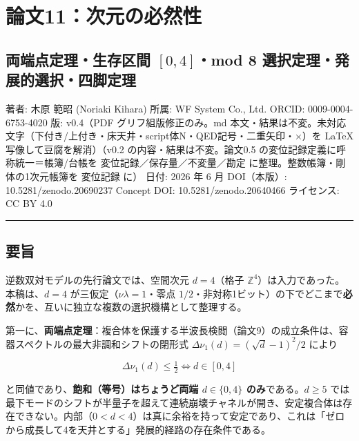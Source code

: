 \documentclass[
]{ltjsarticle}
\author{}
\date{}
\begin{document}
\section{論文11：次元の必然性}\label{ux8ad6ux658711ux6b21ux5143ux306eux5fc5ux7136ux6027}

\subsection{\texorpdfstring{両端点定理・生存区間 \([0,4]\)・mod 8
選択定理・発展的選択・四脚定理}{両端点定理・生存区間 {[}0,4{]}・mod 8 選択定理・発展的選択・四脚定理}}\label{ux4e21ux7aefux70b9ux5b9aux7406ux751fux5b58ux533aux9593-04mod-8-ux9078ux629eux5b9aux7406ux767aux5c55ux7684ux9078ux629eux56dbux811aux5b9aux7406}

著者: 木原 範昭 (Noriaki Kihara) 所属: WF System Co., Ltd. ORCID:
0009-0004-6753-4020 版: v0.4（PDF グリフ組版修正のみ。md
本文・結果は不変。未対応文字（下付き/上付き・床天井・script体N・QED記号・二重矢印・×）を
LaTeX 写像して豆腐を解消）（v0.2 の内容・結果は不変。論文0.5
の変位記録定義に呼称統一＝帳簿/台帳を 変位記録／保存量／不変量／勘定
に整理。整数帳簿・剛体の1次元帳簿を 変位記録 に） 日付: 2026 年 6 月
DOI（本版）: 10.5281/zenodo.20690237 Concept DOI:
10.5281/zenodo.20640466 ライセンス: CC BY 4.0

\begin{center}\rule{0.5\linewidth}{0.5pt}\end{center}

\subsection{要旨}\label{ux8981ux65e8}

逆数双対モデルの先行論文では、空間次元 \(d=4\)（格子
\(\mathbb{Z}^4\)）は入力であった。本稿は、\(d=4\)
が三仮定（\(\nu\lambda=1\)・零点
\(1/2\)・非対称1ビット）の下でどこまで\textbf{必然}かを、互いに独立な複数の選択機構として整理する。

第一に、\textbf{両端点定理}：複合体を保護する半波長検閲（論文9）の成立条件は、容器スペクトルの最大非調和シフトの閉形式
\(\Delta\nu_1(d)=(\sqrt d-1)^2/2\) により

\[
\Delta\nu_1(d)\le\tfrac12\iff d\in[0,4]
\]

と同値であり、\textbf{飽和（等号）はちょうど両端 \(d\in\{0,4\}\)
のみ}である。\(d\ge5\)
では最下モードのシフトが半量子を超えて連続崩壊チャネルが開き、安定複合体は存在できない。内部（\(0<d<4\)）は真に余裕を持って安定であり、これは「ゼロから成長して4を天井とする」発展的経路の存在条件である。
\end{document}

